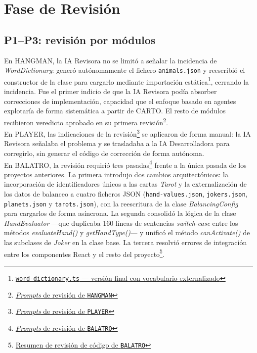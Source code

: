 \section{Fase de Revisión} \label{sec:dev-review}
\subsection{P1--P3: revisión por módulos}
En \ac{HANGMAN}, la \ac{IA} Revisora no se limitó a señalar la incidencia de \textit{WordDictionary}: generó autónomamente el fichero \texttt{animals.json} y reescribió el constructor de la clase para cargarlo mediante importación estática\footnote{\href{https://github.com/alu0101549491/TFG-Fabian-Gonzalez-Lence/blob/main/projects/1-TheHangmanGame/src/models/word-dictionary.ts\#L30-L34}{\texttt{word-dictionary.ts} — versión final con vocabulario externalizado}}, cerrando la incidencia. 
Fue el primer indicio de que la IA Revisora podía absorber correcciones de implementación, capacidad que el enfoque basado en agentes explotaría de forma sistemática a partir de \ac{CARTO}. El resto de módulos recibieron veredicto aprobado en su primera revisión\footnote{\href{https://github.com/alu0101549491/TFG-Fabian-Gonzalez-Lence/tree/main/resources/prompts/1-TheHangmanGame/4-RevisionPorModulo}{\textit{Prompts} de revisión de \texttt{HANGMAN}}}.\\

En \ac{PLAYER}, las indicaciones de la revisión\footnote{\href{https://github.com/alu0101549491/TFG-Fabian-Gonzalez-Lence/tree/main/resources/prompts/2-MusicWebPlayer/4-RevisionPorModulo}{\textit{Prompts} de revisión de \texttt{PLAYER}}} se aplicaron de forma manual: la \ac{IA} Revisora señalaba el problema y se trasladaba a la \ac{IA} Desarrolladora para corregirlo, sin generar el código de corrección de forma autónoma.\\

En \ac{BALATRO}, la revisión requirió tres pasadas\footnote{\href{https://github.com/alu0101549491/TFG-Fabian-Gonzalez-Lence/tree/main/resources/prompts/3-MiniBalatro/4-RevisionPorGrupodeModulos}{\textit{Prompts} de revisión de \texttt{BALATRO}}} frente a la única pasada de los proyectos anteriores. La primera introdujo dos cambios arquitectónicos: la incorporación de identificadores únicos a las cartas \textit{Tarot} y la externalización de los datos de balanceo a cuatro ficheros JSON (\texttt{hand-values.json}, \texttt{jokers.json}, \texttt{planets.json} y \texttt{tarots.json}), con la reescritura de la clase \textit{BalancingConfig} para cargarlos de forma asíncrona. La segunda consolidó la lógica de la clase \textit{HandEvaluator} ---que duplicaba 160 líneas de sentencias \textit{switch-case} entre los métodos \textit{evaluateHand()} y \textit{getHandType()}--- y unificó el método \textit{canActivate()} de las subclases de \textit{Joker} en la clase base. La tercera resolvió errores de integración entre los componentes React y el resto del proyecto\footnote{\href{https://github.com/alu0101549491/TFG-Fabian-Gonzalez-Lence/blob/main/projects/3-MiniBalatro/docs/CODE_REVIEW_SUMMARY.md}{Resumen de revisión de código de \texttt{BALATRO}}}.

